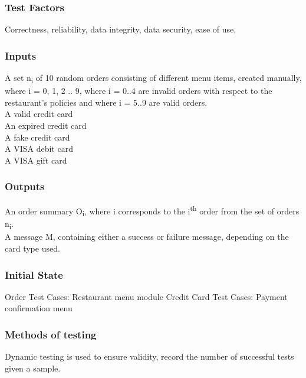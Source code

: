 \documentclass[12pt]{article}
\begin{document}
\subsubsection{Test Factors}
Correctness, reliability, data integrity, data security, ease of use, 
\subsubsection{Inputs}
A set \texorpdfstring{n\textsubscript{i}}{ni} of 10 random orders consisting of different menu items, created manually, where i = 0, 1, 2 .. 9, where i = 0..4 are invalid orders with respect to the restaurant's policies and where i = 5..9 are valid orders. \\
A valid credit card \\
An expired credit card \\
A fake credit card \\
A VISA debit card \\
A VISA gift card \\
\subsubsection{Outputs}
An order summary \texorpdfstring{O\textsubscript{i}}{Oi}, where i corresponds to the \texorpdfstring{i\textsuperscript{th}}{ith} order from the set of orders \texorpdfstring{n\textsubscript{i}}{ni}. \\
A message M, containing either a success or failure message, depending on the card type used. 
\subsubsection{Initial State}
Order Test Cases: Restaurant menu module
Credit Card Test Cases: Payment confirmation menu
\subsubsection{Methods of testing}
Dynamic testing is used to ensure validity, record the number of successful tests given a sample.
\end{document}
